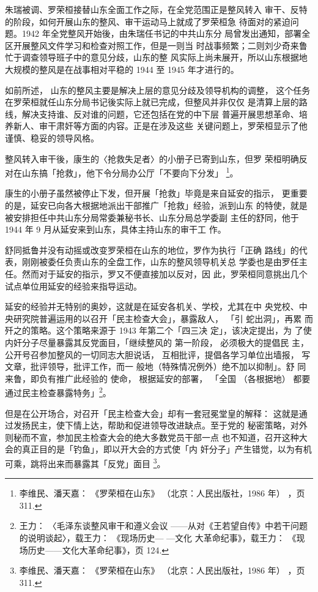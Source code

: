 朱瑞被调、罗荣桓接替山东全面工作之际，在全党范围正是整风转入
审干、反特的阶段，如何开展山东的整风、审干运动马上就成了罗荣桓急
待面对的紧迫问题。1942 年全党整风开始後，由朱瑞任书记的中共山东分
局曾发出通知，部署全区开展整风文件学习和检查对照工作，但是一则当
时战事频繁；二则刘少奇来鲁忙于调查领导班子中的意见分歧，山东的整
风实际上尚未展开，所以山东根据地大规模的整风是在战事相对平稳的
1944 至 1945 年才进行的。

如前所述，
山东的整风主要是解决上层的意见分歧及领导机构的调整，
这个任务在罗荣桓就任山东分局书记後实际上就已完成，但整风并非仅仅
是清算上层的路线，解决支持谁、反对谁的问题，它还包括在党的中下层
普遍开展思想革命、培养新人、审干肃奸等方面的内容。正是在涉及这些
关键问题上，罗荣桓显示了他谨慎、稳妥的领导风格。

整风转入审干後，康生的〈抢救失足者〉的小册子已寄到山东，但罗
荣桓明确反对在山东搞「抢救」，他下令分局办公厅「不要向下分发」
\footnote{李维民、潘天嘉：
《罗荣桓在山东》
（北京：人民出版社，1986 年）
，页 311.}。

康生的小册子虽然被停止下发，但开展「抢救」毕竟是来自延安的指示，
更重要的是，延安已向各大根据地派出干部推广「抢救」经验，派到山东
的特使，就是被安排担任中共山东分局常委兼秘书长、山东分局总学委副
主任的舒同，他于 1944 年 9 月从延安来到山东，具体主持山东的审干工
作。

舒同抵鲁并没有动摇或改变罗荣桓在山东的地位，罗作为执行「正确
路线」的代表，刚刚被委任负责山东的全盘工作，山东的整风领导机关总
学委也是由罗任主任。然而对于延安的指示，罗又不便直接加以反对，因
此，罗荣桓同意挑出几个试点单位用延安的经验来指导运动。

延安的经验并无特别的奥妙，这就是在延安各机关、学校，尤其在中 央党校、中
央研究院普遍运用的以召开「民主检查大会」，暴露敌人， 「引 蛇出洞」，再累
而歼之的策略。这个策略来源于 1943 年第二个「四三决 定」，该决定提出，为
了使内奸分子尽量暴露其反党面目，「继续整风的 第一阶段， 必须极大的提倡民
主， 公开号召参加整风的一切同志大胆说话， 互相批评，提倡各学习单位出墙报，
写文章，批评领导，批评工作，而一 般地（特殊情况例外）绝不加以抑制」。舒
同来鲁，即负有推广此经验的 使命， 根据延安的部署， 「全国 （各根据地）
都要通过民主检查暴露特务」\footnote{王力： 〈毛泽东谈整风审干和遵义会议
——从对《王若望自传》中若干问题的说明谈起〉，载王力： 《现场历史— —文化
大革命纪事》，载王力： 《现场历史——文化大革命纪事》，页 124.}。

但是在公开场合，对召开「民主检查大会」却有一套冠冕堂皇的解释：
这就是通过发扬民主，使下情上达，帮助和促进领导改进缺点。至于党的
秘密策略，对外则秘而不宣，参加民主检查大会的绝大多数党员干部一点
也不知道，召开这种大会的真正目的是「钓鱼」，即以开大会的方式使「内
奸分子」产生错觉，以为有机可乘，跳将出来而暴露其「反党」面目
\footnote{李维民、潘天嘉：
《罗荣桓在山东》
（北京：人民出版社，1986 年）
，页 311.}。

